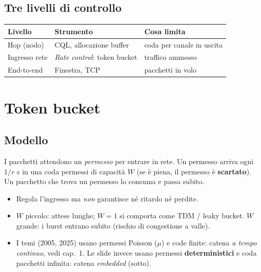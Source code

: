 \subsection{Tre livelli di controllo}
\begin{center}
\begin{tabular}{lll}
\toprule
Livello & Strumento & Cosa limita\\
\midrule
Hop (nodo) & CQL, allocazione buffer & coda per canale in uscita\\
Ingresso rete & \emph{Rate control}: token bucket & traffico ammesso\\
End-to-end & Finestra, TCP & pacchetti in volo\\
\bottomrule
\end{tabular}
\end{center}

\section{Token bucket}\label{cap7-tb}

\subsection{Modello}
I pacchetti attendono un \emph{permesso} per entrare in rete. Un permesso arriva ogni $1/r$ s in una coda permessi di capacità $W$ (se è piena, il permesso è \textbf{scartato}). Un pacchetto che trova un permesso lo consuma e passa subito.
\begin{itemize}
\item Regola l'ingresso ma \emph{non} garantisce né ritardo né perdite.
\item $W$ piccolo: attese lunghe; $W=1$ si comporta come TDM / leaky bucket. $W$ grande: i burst entrano subito (rischio di congestione a valle).
\item I temi (2005, 2025) usano permessi Poisson ($\mu$) e code finite: catena \emph{a tempo continuo}, vedi cap.~1. Le slide invece usano permessi \textbf{deterministici} e coda pacchetti infinita: catena \emph{embedded} (sotto).
\end{itemize}

